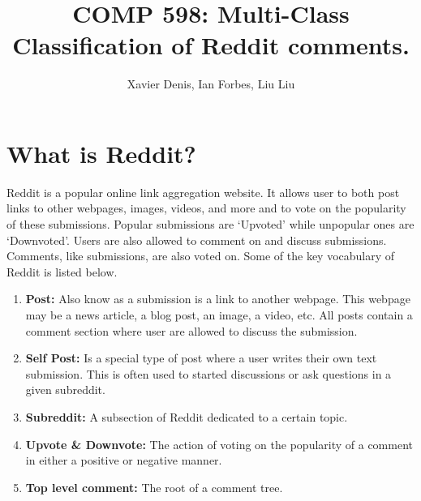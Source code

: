 \documentclass[10pt,twocolumn]{article}
\title {COMP 598: Multi-Class Classification of Reddit comments.}
\author {Xavier Denis, Ian Forbes, Liu Liu}
\begin{document}
\section{What is Reddit?}

Reddit is a popular online link aggregation website. It allows user to both post links to other webpages, images, videos, and more and to vote on the popularity of these submissions. Popular submissions are `Upvoted' while unpopular ones are `Downvoted'. Users are also allowed to comment on and discuss submissions. Comments, like submissions, are also voted on. Some of the key vocabulary of Reddit is listed below.

\begin {enumerate}
\item \textbf{Post:} Also know as a submission is a link to another webpage. This webpage may be a news article, a blog post, an image, a video, etc. All posts contain a comment section where user are allowed to discuss the submission.
\item \textbf{Self Post:} Is a special type of post where a user writes their own text submission. This is often used to started discussions or ask questions in a given subreddit. 
\item \textbf{Subreddit:} A subsection of Reddit dedicated to a certain topic. 
\item \textbf{Upvote \& Downvote:} The action of voting on the popularity of a comment in either a positive or negative manner.
\item \textbf{Top level comment:} The root of a comment tree.
\end {enumerate}
\end{document}
